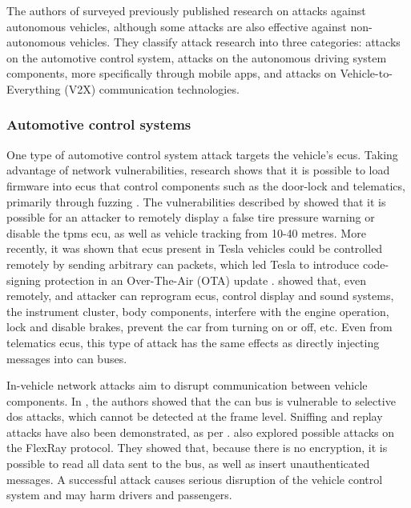 The authors of \cite{Kim2021} surveyed previously published research on attacks against autonomous vehicles, although some attacks are also effective against non-autonomous vehicles. They classify attack research into three categories: attacks on the automotive control system, attacks on the autonomous driving system components, more specifically through mobile apps, and attacks on Vehicle-to-Everything (V2X) communication technologies.

\subsubsection{Automotive control systems}

One type of automotive control system attack targets the vehicle's \glspl{ecu}. Taking advantage of network vulnerabilities, research shows that it is possible to load firmware into \glspl{ecu} that control components such as the door-lock and telematics, primarily through fuzzing \citep{Koscher2010}. The vulnerabilities described by \cite{rouf2010security} showed that it is possible for an attacker to remotely display a false tire pressure warning or disable the \gls{tpms} \gls{ecu}, as well as vehicle tracking from 10-40 metres. More recently, it was shown that \glspl{ecu} present in Tesla vehicles could be controlled remotely by sending arbitrary \gls{can} packets, which led Tesla to introduce code-signing protection in an Over-The-Air (OTA) update \citep{Nie2017}. \cite{miller2015remote} showed that, even remotely, and attacker can reprogram \glspl{ecu}, control display and sound systems, the instrument cluster, body components, interfere with the engine operation, lock and disable brakes, prevent the car from turning on or off, etc. Even from telematics \glspl{ecu}, this type of attack has the same effects as directly injecting messages into \gls{can} buses.\par

In-vehicle network attacks aim to disrupt communication between vehicle components. In \cite{Palanca2017}, the authors showed that the \gls{can} bus is vulnerable to selective \gls{dos} attacks, which cannot be detected at the frame level. Sniffing and replay attacks have also been demonstrated, as per \cite{hoppe2009applying}. \cite{nilsson2009first} also explored possible attacks on the FlexRay protocol. They showed that, because there is no encryption, it is possible to read all data sent to the bus, as well as insert unauthenticated messages. A successful attack causes serious disruption of the vehicle control system and may harm drivers and passengers.\par

